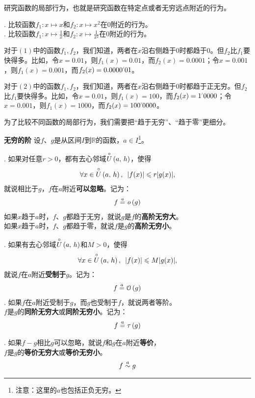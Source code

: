 \documentclass[12pt,UTF8]{ctexbook}
\begin{document}
研究函数的局部行为，也就是研究函数在特定点或者无穷远点附近的行为。

\begin{ex}
    . 比较函数$f_1: x\mapsto x$和$f_2: x\mapsto x^2$在$0$附近的行为。\\
    . 比较函数$f_1: x\mapsto \frac{1}{x}$和$f_2: x\mapsto \frac{1}{x^2}$在$0$附近的行为。
\end{ex}

对于$(1)$中的函数$f_1,f_2$，我们知道，两者在$x$沿右侧趋于$0$时都趋于$0$。但$f_2$比$f_1$要快得多。比如，令$x=0.01$，则$f_1(x) = 0.01$，而$f_2(x) = 0.0001$；令$x=0.001$，则$f_1(x) = 0.001$，而$f_2(x) = 0.0000\dlim{01}$。

对于$(2)$中的函数$f_1,f_2$，我们知道，两者在$x$沿右侧趋于$0$时都趋于正无穷。但$f_2$比$f_1$要快得多。比如，令$x=0.01$，则$f_1(x) = 100$，而$f_2(x) = 1\dlim{0000}$；令$x=0.001$，则$f_1(x) = 1000$，而$f_2(x) = 100\dlim{0000}$。

为了比较不同函数的局部行为，我们需要把“趋于无穷”、“趋于零”更细分。

\begin{df}{\textbf{无穷的阶}}
    设$f$、$g$是从区间$I$到$\mathbb{R}$的函数，$a\in I$\footnote{注意：这里的$a$也包括正负无穷。}。

    . 如果对任意$r>0$，都有去心邻域$\overset{\circ}{U}\left(a,\,h\right)$，使得
    $$ \forall x \in \overset{\circ}{U}\left(a,\,h\right), \,\,\, |f(x)| \leqslant r |g(x)|,$$
    \indent 就说相比于$g$，$f$在$a$附近\textbf{可以忽略}。记为：
    $$ f \overset{a}{=} \mathit{o}\left(g\right)$$
    \indent 如果$x$趋于$a$时，$f$、$g$都趋于无穷，就说$g$是$f$的\textbf{高阶无穷大}。\\
    \indent 如果$x$趋于$a$时，$f$、$g$都趋于零，就说$f$是$g$的\textbf{高阶无穷小}。

    . 如果有去心邻域$\overset{\circ}{U}\left(a,\,h\right)$和$M > 0$，使得
    $$ \forall x \in \overset{\circ}{U}\left(a,\,h\right), \,\,\, |f(x)| \leqslant M |g(x)|,$$
    \indent 就说$f$在$a$附近\textbf{受制于}$g$。记为：
    $$ f \overset{a}{=} \mathcal{O}\left(g\right)$$
    . 如果$f$在$a$附近受制于$g$，而$g$也受制于$f$，就说两者等阶。\\
    \indent $f$是$g$的\textbf{同阶无穷大}或\textbf{同阶无穷小}。记为：
    $$ f \overset{a}{=} \tau\left(g\right)$$

    . 如果$f - g$相比$g$可以忽略，就说$f$和$g$在$a$附近\textbf{等价}，\\
    \indent $f$是$g$的\textbf{等价无穷大}或\textbf{等价无穷小}。
    $$ f \overset{a}{\sim} g$$

\end{df}
\end{document}
